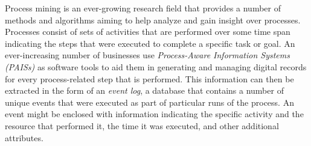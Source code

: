 Process mining \cite{pm} is an ever-growing research field that provides a number of methods and algorithms aiming to help analyze and gain insight over processes.
Processes consist of sets of activities that are performed over some time span indicating the steps that were executed to complete a specific task or goal.
An ever-increasing number of businesses use \textit{Process-Aware Information Systems (PAISs)} as software tools to aid them in generating and managing digital records for every process-related step that is performed.
This information can then be extracted in the form of an \textit{event log}, a database that contains a number of unique events that were executed as part of particular runs of the process.
An event might be enclosed with information indicating the specific activity and the resource that performed it, the time it was executed, and other additional attributes.


